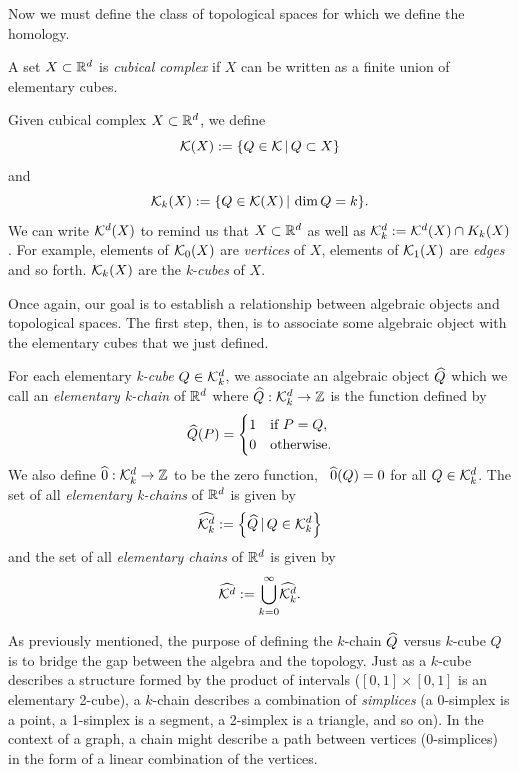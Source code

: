 Now we must define the class of topological spaces for which we define the homology.

\begin{defn}
	A set $X \subset \mathbb{R}^d$ is \textit{cubical complex} if $X$ can be written as a finite union of elementary cubes.
\end{defn}

Given cubical complex $X \subset \mathbb{R}^d$, we define
	$$ \mathcal{K}(X) := \{ Q \in \mathcal{K} \, | \, Q \subset X \} $$ and
	$$ \mathcal{K}_k (X) := \{ Q \in \mathcal{K} (X) \, | \, \dim{Q} = k \}. $$
We can write $\mathcal{K}^{d} (X)$ to remind us that $X \subset \mathbb{R}^d$ as well as $\mathcal{K}^{d}_k := \mathcal{K}^{d}(X) \cap K_k(X)$. For example, elements of $\mathcal{K}_0(X)$ are \textit{vertices} of $X$, elements of $\mathcal{K}_1(X)$ are \textit{edges} and so forth. $\mathcal{K}_k(X)$ are the \textit{k-cubes} of $X$.

Once again, our goal is to establish a relationship between algebraic objects and topological spaces. The first step, then, is to associate some algebraic object with the elementary cubes that we just defined.
%
\begin{defn}
	For each elementary \textit{k-cube} $Q \in \mathcal{K}^{d}_k$, we associate an algebraic object $\widehat{Q}$ which we call an \textit{elementary k-chain} of $\mathbb{R}^d$ where $\widehat{Q} : \mathcal{K}^{d}_k \rightarrow \mathbb{Z}$ is the function defined by
	$$\widehat{Q}(P) =
		\begin{cases}
			1	& \text{if } P = Q, \\
			0	& \text{otherwise.}
		\end{cases}$$
	We also define $\widehat{0} : \mathcal{K}^{d}_k \rightarrow \mathbb{Z}$ to be the zero function, \ie~$\widehat{0}(Q) = 0$ for all $Q \in \mathcal{K}^{d}_k$.
	The set of all \textit{elementary k-chains} of $\mathbb{R}^d$ is given by
	$$ \widehat{\mathcal{K}^{d}_k} := \left\{ \widehat{Q} \, | \, Q \in \mathcal{K}^{d}_k \right\} $$ and the set of all \textit{elementary chains} of $\mathbb{R}^d$ is given by
	$$ \widehat{\mathcal{K}^{d}} := { \bigcup_{k=0}^{\infty} } \widehat{\mathcal{K}^{d}_k} . $$
\end{defn}

As previously mentioned, the purpose of defining the $k$-chain $\widehat{Q}$ versus $k$-cube $Q$ is to bridge the gap between the algebra and the topology. Just as a $k$-cube describes a structure formed by the product of intervals (\eg $[0,1] \times [0,1]$ is an elementary 2-cube), a $k$-chain describes a combination of \textit{simplices} (a 0-simplex is a point, a 1-simplex is a segment, a 2-simplex is a triangle, and so on). In the context of a graph, a chain might describe a path between vertices (0-simplices) in the form of a linear combination of the vertices.

